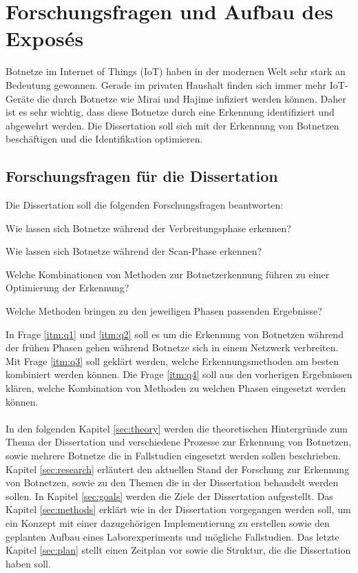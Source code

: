 \section{Forschungsfragen und Aufbau des Exposés}

Botnetze im Internet of Things (IoT) haben in der modernen Welt sehr stark an Bedeutung gewonnen. Gerade im privaten 
Haushalt finden sich immer mehr IoT-Geräte die durch Botnetze wie Mirai und Hajime infiziert werden können. Daher ist es 
sehr wichtig, dass diese Botnetze durch eine Erkennung identifiziert und abgewehrt werden. Die Dissertation soll sich mit 
der Erkennung von Botnetzen beschäftigen und die Identifikation optimieren.

\subsection*{Forschungsfragen für die Dissertation}


Die Dissertation soll die folgenden Forschungsfragen beantworten:  

\begin{questions}
    \item Wie lassen sich Botnetze während der Verbreitungsphase erkennen? \label{itm:q1}
    \item Wie lassen sich Botnetze während der Scan-Phase erkennen? \label{itm:q2}
    \item Welche Kombinationen von Methoden zur Botnetzerkennung führen zu einer Optimierung der Erkennung? \label{itm:q3}
    \item Welche Methoden bringen zu den jeweiligen Phasen passenden Ergebnisse? \label{itm:q4}
\end{questions}

In Frage \ref{itm:q1} und \ref{itm:q2} soll es um die Erkennung von Botnetzen während der frühen Phasen gehen während Botnetze sich in einem Netzwerk verbreiten. Mit Frage
\ref{itm:q3} soll geklärt werden, welche Erkennungsmethoden am besten kombiniert werden können. Die Frage \ref{itm:q4} soll aus den vorherigen Ergebnissen klären, welche
Kombination von Methoden zu welchen Phasen eingesetzt werden können. \\ \\ In den folgenden Kapitel \ref{sec:theory} werden die theoretischen Hintergründe zum Thema der 
Dissertation und verschiedene Prozesse zur Erkennung von Botnetzen, sowie mehrere Botnetze die in Fallstudien eingesetzt werden sollen beschrieben. Kapitel \ref{sec:research} 
erläutert den aktuellen Stand der Forschung zur Erkennung von Botnetzen, sowie zu den Themen die in der Dissertation behandelt werden sollen. In Kapitel \ref{sec:goals} werden 
die Ziele der Dissertation aufgestellt. Das Kapitel \ref{sec:methods} erklärt wie in der Dissertation vorgegangen werden soll, um ein Konzept mit einer dazugehörigen Implementierung 
zu erstellen sowie den geplanten Aufbau eines Laborexperiments und mögliche Fallstudien. Das letzte Kapitel \ref{sec:plan} stellt einen Zeitplan vor sowie die Struktur, die die 
Dissertation haben soll.